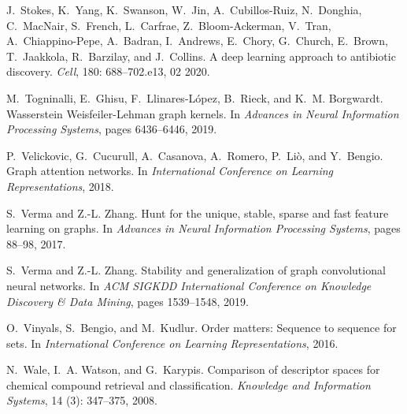 \documentclass{article}
\theoremstyle{definition}
\begin{document}
\begin{thebibliography}{125}
	J.~Stokes, K.~Yang, K.~Swanson, W.~Jin, A.~Cubillos-Ruiz, N.~Donghia,
	C.~MacNair, S.~French, L.~Carfrae, Z.~Bloom-Ackerman, V.~Tran,
	A.~Chiappino-Pepe, A.~Badran, I.~Andrews, E.~Chory, G.~Church, E.~Brown,
	T.~Jaakkola, R.~Barzilay, and J.~Collins.
	\newblock A deep learning approach to antibiotic discovery.
	\newblock \emph{Cell}, 180: 688--702.e13, 02 2020.
	
	M.~Togninalli, E.~Ghisu, F.~Llinares{-}L{\'{o}}pez, B.~Rieck, and K.~M.
	Borgwardt.
	\newblock Wasserstein {Weisfeiler-Lehman} graph kernels.
	\newblock In \emph{Advances in Neural Information Processing Systems}, pages
	6436--6446, 2019.
	
	P.~Velickovic, G.~Cucurull, A.~Casanova, A.~Romero, P.~Li{\`{o}}, and
	Y.~Bengio.
	\newblock Graph attention networks.
	\newblock In \emph{International Conference on Learning Representations}, 2018.
	
	S.~Verma and Z.{-}L. Zhang.
	\newblock Hunt for the unique, stable, sparse and fast feature learning on
	graphs.
	\newblock In \emph{Advances in Neural Information Processing Systems}, pages
	88--98, 2017.
	
	S.~Verma and Z.{-}L. Zhang.
	\newblock Stability and generalization of graph convolutional neural networks.
	\newblock In \emph{{ACM} {SIGKDD} International Conference on Knowledge
		Discovery {\&} Data Mining}, pages 1539--1548, 2019.
	
	O.~Vinyals, S.~Bengio, and M.~Kudlur.
	\newblock Order matters: Sequence to sequence for sets.
	\newblock In \emph{International Conference on Learning Representations}, 2016.
	
	N.~Wale, I.~A. Watson, and G.~Karypis.
	\newblock Comparison of descriptor spaces for chemical compound retrieval and
	classification.
	\newblock \emph{Knowledge and Information Systems}, 14 (3):
	347--375, 2008.
	

\end{thebibliography}
\end{document}
